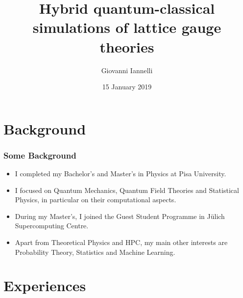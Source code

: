 \documentclass[11pt,t,xcolor=dvipsnames,aspectratio=169]{beamer}
\title[Fellow project presentation]{Hybrid quantum-classical simulations of lattice gauge theories}
\author{Giovanni Iannelli}
\institute{Humboldt University of Berlin}
\date{15 January 2019}
\newlength\leftsidebar
\begin{document}
\leftsidebar
{


\begin{frame}[plain,t]
\titlepage
\end{frame}
}
\hoffset=0in %




\section{Background}

\begin{frame}
    \frametitle{Some Background}
    \begin{itemize}
        \item
            I completed my Bachelor's and Master's in Physics at Pisa University.
        \item
            I focused on Quantum Mechanics, Quantum Field Theories and Statistical Physics, in particular on their computational aspects.
        \item
            During my Master's, I joined the Guest Student Programme in J\"ulich Supercomputing Centre.
        \item
            Apart from Theoretical Physics and HPC, my main other interests are Probability Theory, Statistics and Machine Learning.
    \end{itemize}
\end{frame}

\section{Experiences}
\end{document}
